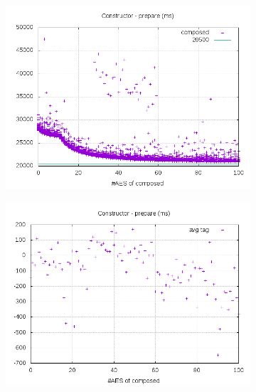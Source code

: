 \documentclass[10pt,a4paper]{article}
\begin{document}
\begin{figure}[h]
    \centering
    \begin{subfigure}[t]{0.3\textwidth}
        \includegraphics[width=\textwidth]{const_prepare_plots}
        \caption{}
    \end{subfigure}
    \begin{subfigure}[t]{0.3\textwidth}
        \includegraphics[width=\textwidth]{const_prepare_avg}
        \caption{}
    \end{subfigure}
    \begin{subfigure}[t]{0.3\textwidth}

\end{subfigure}
\end{figure}
\end{document}
